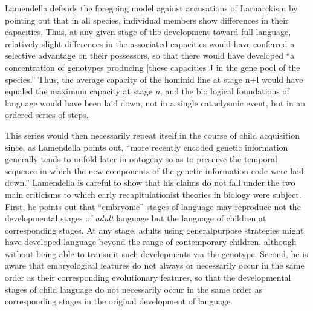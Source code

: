 Lamendella defends the foregoing model against accusations of Larnarckism by pointing out that in all species, individual members show differences in their capacities. Thus, at any given stage of the development toward full language, relatively slight differences in the associated capacities would have conferred a selective advantage on their possessors, so that there would have developed ``a concentration
of genotypes producing [these capacities J in the gene pool of the species.'' Thus, the average capacity of the hominid line at stage n+l would have equaled the maximum capacity at stage \textit{n,} and the bio%
logical foundations of language would have been laid down, not in a single cataclysmic event, but in an ordered series of steps.

This series would then necessarily repeat itself in the course of child acquisition since, as Lamendella points out, ``more recently en\-coded genetic information generally tends to unfold later in ontogeny so as to preserve the temporal sequence in which the new components of the genetic information code were laid down.'' Lamendella is careful to show that his claims do not fall under the two main criticisms to which early recapitulationist theories in biology were subject. First, he points out that ``embryonic'' stages of language may reproduce not the developmental stages of \textit{adult} language but the language of children at corresponding stages. At any stage, adults using general\-purpose strategies might have developed language beyond the range of contemporary children, although without being able to transmit such developments via the genotype. Second, he is aware that embryological features do not always or necessarily occur in the same order as their corresponding evolutionary features, so that the developmental stages of child language do not necessarily occur in the same order as corre\-sponding stages in the original development of language.

